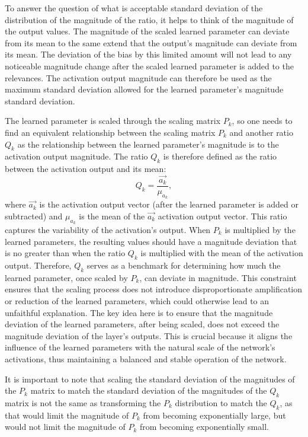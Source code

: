 To answer the question of what is acceptable standard deviation of the distribution of the magnitude of the ratio, it helps to think of the magnitude of the output values. The magnitude of the scaled learned parameter can deviate from its mean to the same extend that the output's magnitude can deviate from its mean. The deviation of the bias by this limited amount will not lead to any noticeable magnitude change after the scaled learned parameter is added to the relevances. The activation output magnitude can therefore be used as the maximum standard deviation allowed for the learned parameter's magnitude standard deviation. 

The learned parameter is scaled through the scaling matrix \(P_{k}\), so one needs to find an equivalent relationship between the scaling matrix \(P_{k}\) and another ratio $Q_{k}$ as the relationship between the learned parameter's magnitude is to the activation output magnitude. The ratio $Q_{k}$ is therefore defined as the ratio between the activation output and its mean:
\begin{equation*}
    Q_{k} = \dfrac{\vec{a_k}}{\mu_{a_k}},
\end{equation*}
where $\vec{a_k}$ is the activation output vector (\ie after the learned parameter is added or subtracted) and $\mu_{a_k}$ is the mean of the $\vec{a_k}$ activation output vector. This ratio captures the variability of the activation's output. When \( P_{k} \) is multiplied by the learned parameters, the resulting values should have a magnitude deviation that is no greater than when the ratio $Q_{k}$ is multiplied with the mean of the activation output. Therefore, \( Q_{k} \) serves as a benchmark for determining how much the learned parameter, once scaled by \( P_{k} \), can deviate in magnitude. This constraint ensures that the scaling process does not introduce disproportionate amplification or reduction of the learned parameters, which could otherwise lead to an unfaithful explanation. The key idea here is to ensure that the magnitude deviation of the learned parameters, after being scaled, does not exceed the magnitude deviation of the layer's outputs. This is crucial because it aligns the influence of the learned parameters with the natural scale of the network's activations, thus maintaining a balanced and stable operation of the network.


It is important to note that scaling the standard deviation of the magnitudes of the \(P_{k}\) matrix to match the standard deviation of the magnitudes of the $Q_{k}$ matrix is not the same as transforming the \(P_{k}\) distribution to match the $Q_{k}$, as that would limit the magnitude of \(P_{k}\) from becoming exponentially large, but would not limit the magnitude of \(P_{k}\) from becoming exponentially small. 



